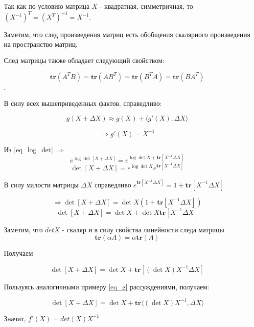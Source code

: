 \documentclass[a4paper,12pt]{article}
\newcommand{\lt}{\left}
\newcommand{\rt}{\right}
\newcommand{\al}{\alpha}
\newcommand{\D}{\Delta}
\begin{document}
 Так как по условию матрица $X$ - квадратная, симметричная, то $\lt(X^{-1}\rt)^T = \lt(X^{T}\rt)^{-1} = X^{-1}$.
 
 Заметим, что след произведения матриц есть обобщения скалярного произведения на пространство матриц. 
 
След матрицы также обладает следующий свойством:
 
 $$\mathbf{tr}(A^TB) = \mathbf{tr}(AB^T) = \mathbf{tr}(B^TA) = \mathbf{tr}(BA^T)$$. 
 
В силу всех вышеприведенных фактов, справедливо:
 
 \begin{equation}\label{eq_g}
 g(X + \Delta X) \approx g(X) + \langle g'(X), \Delta X \rangle
 \end{equation}
 
\begin{equation}\label{eq_dg}
\Rightarrow g'(X) = X^{-1}
\end{equation}
 
 Из \eqref{eq_log_det} $\Rightarrow$ $$e^{\log\det\left[ X+ \Delta X\right]} = e^{\log\det X + \mathbf{tr}\left[X^{-1}\Delta X \right]} $$
 $$\det\left[ X+ \Delta X\right] = e^{\log\det X} e^{\mathbf{tr}\left[X^{-1}\Delta X \right]} $$
 
 В силу малости матрицы $\D X$ справедливо $e^{\mathbf{tr}\left[X^{-1}\Delta X \right]} = 1 + \mathbf{tr}\left[X^{-1}\Delta X \right] $
 
 $$\Rightarrow\det\left[ X+ \Delta X\right] = \det X\lt( 1 + \mathbf{tr}\left[X^{-1}\Delta X \right]\rt)  $$
 \begin{equation}\label{eq_3}
 \det\left[ X+ \Delta X\right] = \det X+ \det X\mathbf{tr}\left[X^{-1}\Delta X \right]
 \end{equation}
 
 Заметим, что $det X$ - скаляр и в силу свойства линейности следа матрицы $$\mathbf{tr}\lt(\al A \rt) = \al \mathbf{tr}\lt(A \rt)$$
 
 Получаем 
 
 $$ \det\left[ X+ \Delta X\right] = \det X+ \mathbf{tr}\left[(\det X) X^{-1}\Delta X \right]$$
 
 Пользуясь аналогичными примеру \eqref{eq_g} рассуждениями, получаем:
 
 $$ \det\left[ X+ \Delta X\right] = \det X+ \mathbf{tr}\langle (\det X) X^{-1}, \Delta X \rangle$$
 
Значит, $f'(X) = det(X) X^{-1}$

\vspace{\baselineskip}
\end{document}
